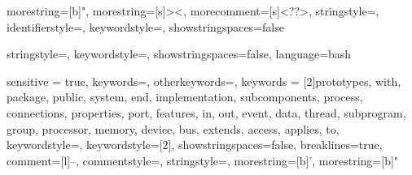 




{
    morestring=[b]",
    morestring=[s]{>}{<},
    morecomment=[s]{<?}{?>},
    stringstyle=\color{black},
    identifierstyle=\color{darkblue},
    keywordstyle=\color{cyan},
    showstringspaces=false
}


{
    stringstyle=\color{blue},
    keywordstyle=\color{blue},
    showstringspaces=false,
    language=bash
}



{
	sensitive = true,
	keywords={},
	otherkeywords={},%
  	keywords = [2]{prototypes, with, package, public, system, end, implementation, subcomponents, process, connections, properties, port, features, in, out, event, data, thread, subprogram, group, processor, memory, device, bus, extends, access, applies, to},
  	keywordstyle=\color{blue},
  	keywordstyle=[2]\color{aadl_keywords_purple},%
  	showstringspaces=false,
  	breaklines=true,
  	comment=[l]{--},
  	commentstyle=\color{aadl_comment_green}\ttfamily,
  	stringstyle=\color{red}\ttfamily,
  	morestring=[b]',
  	morestring=[b]"
}

